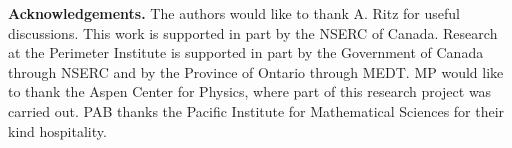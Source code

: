 \documentclass[12pt]{revtex4}
\begin{document}
{\bf Acknowledgements.} The authors would like to thank A. Ritz for useful discussions.
This work is supported in part by the NSERC of Canada. Research at the Perimeter Institute 
is supported in part by the Government
of Canada through NSERC and by the Province of Ontario through MEDT. MP would like to thank 
the Aspen Center for Physics, where part of this research project was carried out. 
PAB thanks the Pacific Institute for Mathematical Sciences for their kind hospitality.




\end{document}
